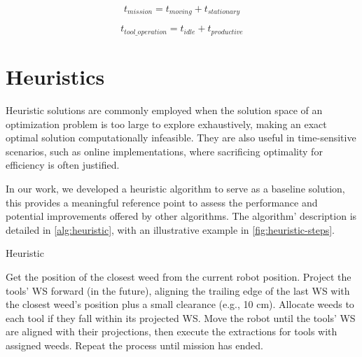 \begin{equation}
    t_{mission} = t_{moving} + t_{stationary}
\label{eq:total-mission-time}
\end{equation}

\begin{equation}
    t_{tool\_operation} = t_{idle} + t_{productive}
\label{eq:tool-usage-time}
\end{equation}


\section{Heuristics}
Heuristic solutions are commonly employed when the solution space of an optimization problem is too large to explore exhaustively, making an exact optimal solution computationally infeasible. They are also useful in time-sensitive scenarios, such as online implementations, where sacrificing optimality for efficiency is often justified.

In our work, we developed a heuristic algorithm to serve as a baseline solution, this provides a meaningful reference point to assess the performance and potential improvements offered by other algorithms. The algorithm' description is detailed in \ref{alg:heuristic}, with an illustrative example in \autoref{fig:heuristic-steps}.

\begin{algorithm}
    \caption{Heuristic}
    \begin{algorithmic}[1]
        \STATE Get the position of the closest weed from the current robot position.  
        \STATE Project the tools' \ac{WS} forward (in the future), aligning the trailing edge of the last \ac{WS} with the closest weed's position plus a small clearance (e.g., 10 cm).  
        \STATE Allocate weeds to each tool if they fall within its projected \ac{WS}.
        \STATE Move the robot until the tools' \ac{WS} are aligned with their projections, then execute the extractions for tools with assigned weeds.  
        \STATE Repeat the process until mission has ended.  
    \end{algorithmic}
    \label{alg:heuristic}
\end{algorithm}

